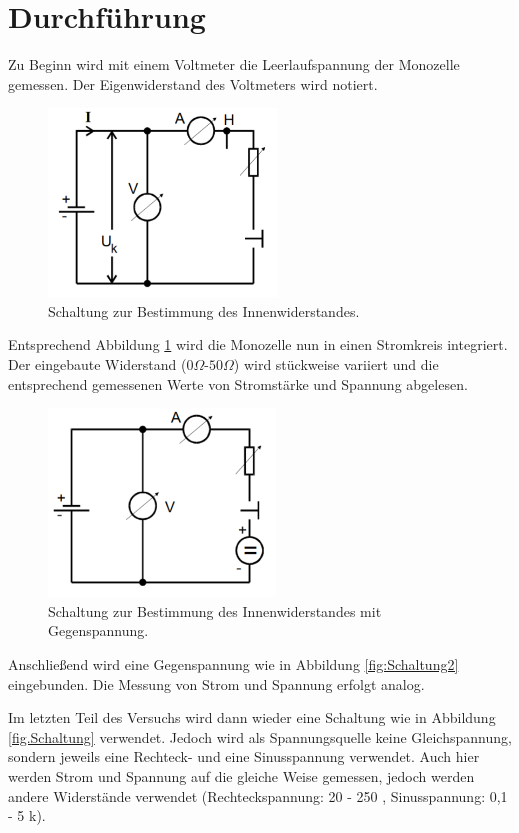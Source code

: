 \section{Durchführung}
\label{sec:Durchführung}
Zu Beginn wird mit einem Voltmeter die Leerlaufspannung der Monozelle gemessen.
Der Eigenwiderstand des Voltmeters wird notiert.

\begin{figure}[H]
  \centering
  \includegraphics[height=5cm]{Schaltung.PNG}
  \caption{Schaltung zur Bestimmung des Innenwiderstandes. \cite{sample}}
  \label{fig:Schaltung}
\end{figure}

Entsprechend Abbildung \ref{fig:Schaltung} wird die Monozelle nun in einen
Stromkreis integriert. Der eingebaute Widerstand ($0 \Omega$-$50\Omega$) wird stückweise variiert und
die entsprechend gemessenen Werte von Stromstärke und Spannung abgelesen.

\begin{figure}[H]
  \centering
  \includegraphics[height=5cm]{Schaltung1.PNG}
  \caption{Schaltung zur Bestimmung des Innenwiderstandes mit Gegenspannung. \cite{sample}}
  \label{fig:Schaltung1}
\end{figure}

Anschließend wird eine Gegenspannung wie in Abbildung \ref{fig:Schaltung2}
eingebunden. Die Messung von Strom und Spannung erfolgt analog.

Im letzten Teil des Versuchs wird dann wieder eine Schaltung wie in Abbildung
\ref{fig.Schaltung} verwendet. Jedoch wird als Spannungsquelle keine Gleichspannung,
sondern jeweils eine Rechteck- und eine Sinusspannung verwendet. Auch hier werden
Strom und Spannung auf die gleiche Weise gemessen, jedoch werden andere Widerstände
verwendet (Rechteckspannung: 20 - 250 \Omega, Sinusspannung: 0,1 - 5 k\Omega).
